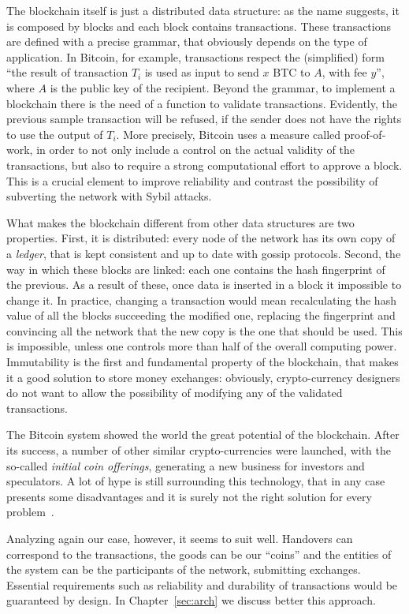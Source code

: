 The blockchain itself is just a distributed data structure: as the name suggests, it is composed by blocks and each block contains transactions. These transactions are defined with a precise grammar, that obviously depends on the type of application. In Bitcoin, for example, transactions respect the (simplified) form ``the result of transaction $T_i$ is used as input to send $x$ BTC to $A$, with fee $y$'', where $A$ is the public key of the recipient. Beyond the grammar, to implement a blockchain there is the need of a function to validate transactions. Evidently, the previous sample transaction will be refused, if the sender does not have the rights to use the output of $T_i$. More precisely, Bitcoin uses a measure called proof-of-work, in order to not only include a control on the actual validity of the transactions, but also to require a strong computational effort to approve a block. This is a crucial element to improve reliability and contrast the possibility of subverting the network with Sybil attacks.

What makes the blockchain different from other data structures are two properties. First, it is distributed: every node of the network has its own copy of a \emph{ledger}, that is kept consistent and up to date with gossip protocols. Second, the way in which these blocks are linked: each one contains the hash fingerprint of the previous. As a result of these, once data is inserted in a block it impossible to change it. In practice, changing a transaction would mean recalculating the hash value of all the blocks succeeding the modified one, replacing the fingerprint and convincing all the network that the new copy is the one that should be used. This is impossible, unless one controls more than half of the overall computing power. Immutability is the first and fundamental property of the blockchain, that makes it a good solution to store money exchanges: obviously, crypto-currency designers do not want to allow the possibility of modifying any of the validated transactions.

The Bitcoin system showed the world the great potential of the blockchain. After its success, a number of other similar crypto-currencies were launched, with the so-called \emph{initial coin offerings}, generating a new business for investors and speculators. A lot of hype is still surrounding this technology, that in any case presents some disadvantages and it is surely not the right solution for every problem~\cite{noblockchain}. 

Analyzing again our case, however, it seems to suit well. Handovers can correspond to the transactions, the goods can be our ``coins'' and the entities of the system can be the participants of the network, submitting exchanges. Essential requirements such as reliability and durability of transactions would be guaranteed by design. In Chapter~\ref{sec:arch} we discuss better this approach.

